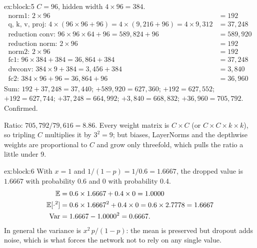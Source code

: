 \begin{solution}{ex:block:5}
$C = 96$, hidden width $4\times96 = 384$.
\begin{align*}
  \text{norm1: } 2\times96 &= 192\\
  \text{q, k, v, proj: } 4\times(96\times96 + 96) = 4\times(9{,}216 + 96) = 4\times9{,}312 &= 37{,}248\\
  \text{reduction conv: } 96\times96\times64 + 96 = 589{,}824 + 96 &= 589{,}920\\
  \text{reduction norm: } 2\times96 &= 192\\
  \text{norm2: } 2\times96 &= 192\\
  \text{fc1: } 96\times384 + 384 = 36{,}864 + 384 &= 37{,}248\\
  \text{dwconv: } 384\times9 + 384 = 3{,}456 + 384 &= 3{,}840\\
  \text{fc2: } 384\times96 + 96 = 36{,}864 + 96 &= 36{,}960
\end{align*}
Sum: $192 + 37{,}248 = 37{,}440$; $+ 589{,}920 = 627{,}360$; $+ 192 = 627{,}552$; $+ 192 = 627{,}744$;
$+ 37{,}248 = 664{,}992$; $+ 3{,}840 = 668{,}832$; $+ 36{,}960 = 705{,}792$. Confirmed.

Ratio: $705{,}792/79{,}616 = 8.86$. Every weight matrix is $C\times C$ (or $C\times C\times k\times k$),
so tripling $C$ multiplies it by $3^2 = 9$; but biases, LayerNorms and the depthwise weights are
proportional to $C$ and grow only threefold, which pulls the ratio a little under 9.
\end{solution}

\begin{solution}{ex:block:6}
With $x = 1$ and $1/(1-p) = 1/0.6 = 1.6667$, the dropped value is $1.6667$ with probability 0.6 and
0 with probability 0.4.
\begin{align*}
  \mathbb{E} &= 0.6\times1.6667 + 0.4\times0 = 1.0000\\
  \mathbb{E}[\cdot^2] &= 0.6\times1.6667^2 + 0.4\times0 = 0.6\times2.7778 = 1.6667\\
  \operatorname{Var} &= 1.6667 - 1.0000^2 = 0.6667 .
\end{align*}
In general the variance is $x^2\,p/(1-p)$: the mean is preserved but dropout adds noise, which is
what forces the network not to rely on any single value.
\end{solution}
